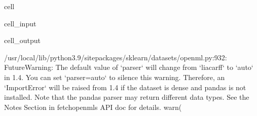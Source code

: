 \documentclass[letterpaper,10pt,french]{sphinxmanual}
\begin{document}
\begin{sphinxuseclass}{cell}
\begin{sphinxuseclass}{cell_input}
\begin{sphinxVerbatim}[commandchars=\\\{\}]
          \PYG{p}{[}        \PYG{p}{]}
         
       
       

\end{sphinxVerbatim}

\end{sphinxuseclass}
\begin{sphinxuseclass}{cell_output}
\begin{sphinxVerbatim}[commandchars=\\\{\}]
/usr/local/lib/python3.9/site\PYGZhy{}packages/sklearn/datasets/\PYGZus{}openml.py:932: FutureWarning: The default value of `parser` will change from `\PYGZsq{}liac\PYGZhy{}arff\PYGZsq{}` to `\PYGZsq{}auto\PYGZsq{}` in 1.4. You can set `parser=\PYGZsq{}auto\PYGZsq{}` to silence this warning. Therefore, an `ImportError` will be raised from 1.4 if the dataset is dense and pandas is not installed. Note that the pandas parser may return different data types. See the Notes Section in fetch\PYGZus{}openml\PYGZsq{}s API doc for details.
  warn(
\end{sphinxVerbatim}


\end{sphinxuseclass}
\end{sphinxuseclass}
\end{document}
